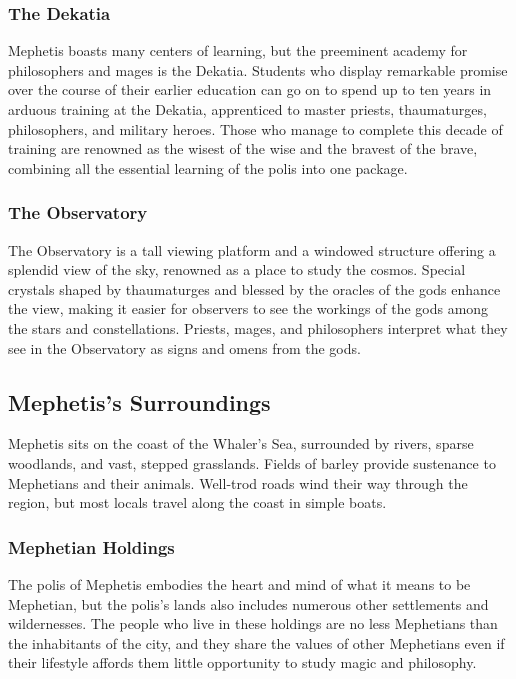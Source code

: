     \subsubsection{The Dekatia}
        Mephetis boasts many centers of learning, but the preeminent academy for philosophers and mages is the Dekatia.
        Students who display remarkable promise over the course of their earlier education can go on to spend up to ten years in arduous training at the Dekatia, apprenticed to master priests, thaumaturges, philosophers, and military heroes.
        Those who manage to complete this decade of training are renowned as the wisest of the wise and the bravest of the brave, combining all the essential learning of the polis into one package.

    \subsubsection{The Observatory}
        The Observatory is a tall viewing platform and a windowed structure offering a splendid view of the sky, renowned as a place to study the cosmos.
        Special crystals shaped by thaumaturges and blessed by the oracles of the gods enhance the view, making it easier for observers to see the workings of the gods among the stars and constellations.
        Priests, mages, and philosophers interpret what they see in the Observatory as signs and omens from the gods.

\subsection*{Mephetis's Surroundings}
    Mephetis sits on the coast of the Whaler's Sea, surrounded by rivers, sparse woodlands, and vast, stepped grasslands.
    Fields of barley provide sustenance to Mephetians and their animals.
    Well-trod roads wind their way through the region, but most locals travel along the coast in simple boats.

    \subsubsection{Mephetian Holdings}
        The polis of Mephetis embodies the heart and mind of what it means to be Mephetian, but the polis's lands also includes numerous other settlements and wildernesses.
        The people who live in these holdings are no less Mephetians than the inhabitants of the city, and they share the values of other Mephetians even if their lifestyle affords them little opportunity to study magic and philosophy.

